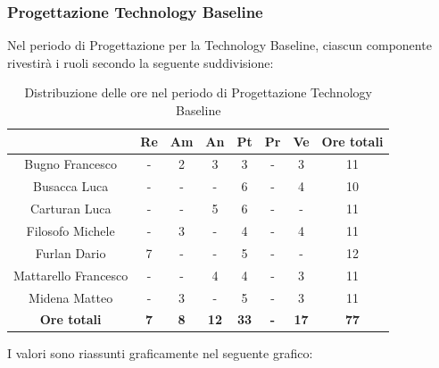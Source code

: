 
\subsubsection{Progettazione Technology Baseline}
Nel periodo di Progettazione per la Technology Baseline, ciascun componente rivestirà i ruoli secondo la seguente suddivisione:
   
   \begin{table}[H]
       \centering
       \renewcommand{\arraystretch}{1.8}
       \begin{tabular}{c|c|c|c|c|c|c|c}
         \rowcolor[HTML]{125E28} 
         \multicolumn{1}{c}{\color[HTML]{FFFFFF}\textbf{ Nominativo }}
         & \multicolumn{1}{c}{\color[HTML]{FFFFFF}\textbf{ Re }}
         & \multicolumn{1}{c}{\color[HTML]{FFFFFF}\textbf{ Am}}
         & \multicolumn{1}{c}{\color[HTML]{FFFFFF}\textbf{ An }}
         & \multicolumn{1}{c}{\color[HTML]{FFFFFF}\textbf{ Pt }}
         & \multicolumn{1}{c}{\color[HTML]{FFFFFF}\textbf{ Pr }}
         & \multicolumn{1}{c}{\color[HTML]{FFFFFF}\textbf{ Ve }}
         & \multicolumn{1}{c}{\color[HTML]{FFFFFF}\textbf{ Ore totali }}\\
         \hline
         Bugno Francesco        & - & 2 & 3 & 3 & - & 3 & 11\\
         Busacca Luca           & - & - & - & 6 & - & 4 & 10\\
         Carturan Luca          & - & - & 5 & 6 & - & - & 11\\
         Filosofo Michele       & - & 3 & - & 4 & - & 4 & 11\\
         Furlan Dario           & 7 & - & - & 5 & - & - & 12\\
         Mattarello Francesco   & - & - & 4 & 4 & - & 3 & 11\\
         Midena Matteo          & - & 3 & - & 5 & - & 3 & 11\\
         \textbf{Ore totali} & \textbf{7} & \textbf{8} & \textbf{12} & \textbf{33} & \textbf{-} & \textbf{17} & \textbf{77}
       \end{tabular}
       \caption{Distribuzione delle ore nel periodo di Progettazione Technology Baseline}
     \end{table}
   
   I valori sono riassunti graficamente nel seguente grafico:
   
